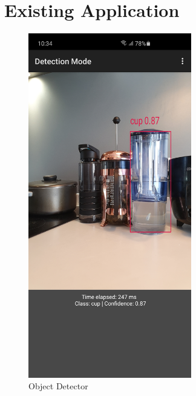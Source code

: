 \chapter{Existing Application}\label{intro}

    \begin{figure}[!ht]
        \centering
        \includegraphics[width=2.8in]{images/chapter2/object-detector.jpg}
        \caption{Object Detector}
        \label{appendix:obj-detector}
    \end{figure}

